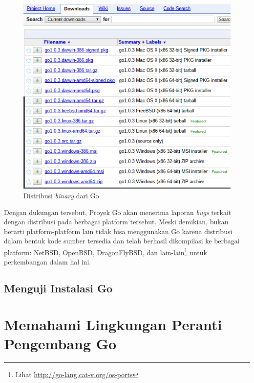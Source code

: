   \begin{figure}
    \begin{center}
      \includegraphics[scale=0.5]{images/download-go.png}
    \end{center}
		\caption{Distribusi \textit{binary} dari Go}
    \label{fig:downloadGo}
  \end{figure}

	Dengan dukungan tersebut, Proyek Go akan menerima laporan \textit{bugs} terkait dengan distribusi pada berbagai platform tersebut. Meski demikian, bukan berarti platform-platform lain tidak bisa menggunakan Go karena distribusi dalam bentuk kode sumber tersedia dan telah berhasil dikompilasi ke berbagai platform: NetBSD, OpenBSD, DragonFlyBSD, dan lain-lain\footnote{Lihat \url{http://go-lang.cat-v.org/os-ports}} untuk perkembangan dalam hal ini.


\subsection{Menguji Instalasi Go}

\lstset{language=Go, caption=hello.go}


\section{Memahami Lingkungan Peranti Pengembang Go}



